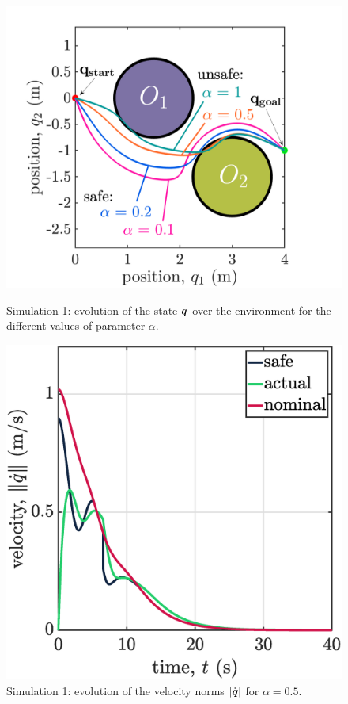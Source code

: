 \begin{center}
\begin{figure}[H]
\begin{minipage}[b]{0.45\linewidth}
\includegraphics[scale=0.30,trim={1.7cm 0 0 0},clip]{figures/sim1map.pdf}
\caption{\label{fig:sim1map}Simulation 1: evolution of the state ${\boldsymbol{q}}$ over the environment for the different values of parameter $\alpha$.}
\end{minipage}
\hfill
\begin{minipage}[b]{0.44\linewidth}
\includegraphics[scale=0.27]{figures/sim1vn.eps}
\caption{\label{fig:sim1v}Simulation 1: evolution of the velocity norms $|\dot{\boldsymbol{q}}|$ for $ \alpha = 0.5$.\\~}
\end{minipage}
\end{figure}
\end{center}
